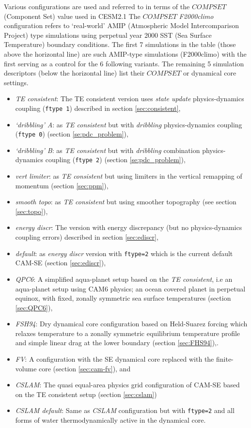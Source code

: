\documentclass{agujournal}
\begin{document}
Various configurations are used and referred to in terms of the $COMPSET$ (Component Set) value used in CESM2.1 The $COMPSET$ {\em{F2000climo}} configuration refers to `real-world' AMIP (Atmospheric Model Intercomparison Project) type simulations using perpetual year 2000 SST (Sea Surface Temperature) boundary conditions. The first 7 simulations in the table (those above the horizontal line) are such AMIP-type simulations (F2000climo) with the first serving as a control for the 6 following variants. The remaining 5 simulation descriptors (below the horizontal line) list their $COMPSET$ or dynamical core settings.

\begin{itemize}
\item {\em{TE consistent}}: The TE consistent version uses {\em{state update}} physics-dynamics coupling ({\tt{ftype 1}}) described in section \ref{sec:consistent},
\item {\em{`dribbling' A}}: as {\em{TE consistent}} but with {\em{dribbling}} physics-dynamics coupling ({\tt{ftype 0}}) (section \ref{se:pdc_problem}),
\item {\em{`dribbling' B}}: as {\em{TE consistent}} but with  {\em{dribbling}} combination physics-dynamics coupling ({\tt{ftype 2}}) (section \ref{se:pdc_problem}),
\item {\em{vert limiter}}: as {\em{TE consistent}} but using limiters in the vertical remapping of momentum (section \ref{sec:ppm}),
\item {\em{smooth topo}}: as {\em{TE consistent}} but  using smoother topography (see section \ref{sec:topo}),
\item {\em{energy discr}}: The version with energy discrepancy (but no physics-dynamics coupling errors) described in section \ref{sec:ediscr},
\item {\em{default}}: as {\em{energy discr}} version with {\tt{ftype=2}} which is the current default CAM-SE (section \ref{sec:ediscr}),
\item {\em{QPC6}}: A simplified aqua-planet setup based on the {\em{TE consistent}}, i.e an aqua-planet setup using CAM6 physics; an ocean covered planet in perpetual equinox, with fixed, zonally symmetric sea surface temperatures \citep{NH2000ASL,MWO2016JAMES} (section \ref{sec:QPC6}), 
\item {\em{FSH94}}: Dry dynamical core configuration based on Held-Suarez forcing which relaxes temperature to a zonally symmetric equilibrium temperature profile and simple linear drag at the lower boundary \citep{HS1994BAMS} (section \ref{sec:FHS94}),. 
\item {\em{FV}}: A configuration with the SE dynamical core replaced with the finite-volume core (section \ref{sec:cam-fv}), and
\item {\em{CSLAM}}: The quasi equal-area physics grid configuration of CAM-SE based on the TE consistent setup (section \ref{sec:cslam})
\item {\em{CSLAM default}}: Same as {\em{CSLAM}} configuration but with {\tt{ftype=2}} and all forms of water thermodynamically active in the dynamical core.
\end{itemize}
\end{document}
